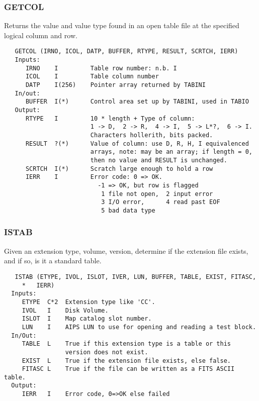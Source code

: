 \subsubsection{GETCOL}
Returns the value and value type found in an open table file
at the specified logical column and row.
\begin{verbatim}
   GETCOL (IRNO, ICOL, DATP, BUFFER, RTYPE, RESULT, SCRTCH, IERR)
   Inputs:
      IRNO    I         Table row number: n.b. I
      ICOL    I         Table column number
      DATP    I(256)    Pointer array returned by TABINI
   In/out:
      BUFFER  I(*)      Control area set up by TABINI, used in TABIO
   Output:
      RTYPE   I         10 * length + Type of column:
                        1 -> D,  2 -> R,  4 -> I,  5 -> L*?,  6 -> I.
                        Characters hollerith, bits packed.
      RESULT  ?(*)      Value of column: use D, R, H, I equivalenced
                        arrays, note: may be an array; if length = 0,
                        then no value and RESULT is unchanged.
      SCRTCH  I(*)      Scratch large enough to hold a row
      IERR    I         Error code: 0 => OK.
                          -1 => OK, but row is flagged
                           1 file not open,  2 input error
                           3 I/O error,      4 read past EOF
                           5 bad data type
\end{verbatim}

\subsubsection{ISTAB}
Given an extension type, volume, version, determine if the extension
file exists, and if so, is it a standard table.
\begin{verbatim}
   ISTAB (ETYPE, IVOL, ISLOT, IVER, LUN, BUFFER, TABLE, EXIST, FITASC,
     *   IERR)
  Inputs:
     ETYPE  C*2  Extension type like 'CC'.
     IVOL   I    Disk Volume.
     ISLOT  I    Map catalog slot number.
     LUN    I    AIPS LUN to use for opening and reading a test block.
  In/Out:
     TABLE  L    True if this extension type is a table or this
                 version does not exist.
     EXIST  L    True if the extension file exists, else false.
     FITASC L    True if the file can be written as a FITS ASCII table.
  Output:
     IERR   I    Error code, 0=>OK else failed
\end{verbatim}

